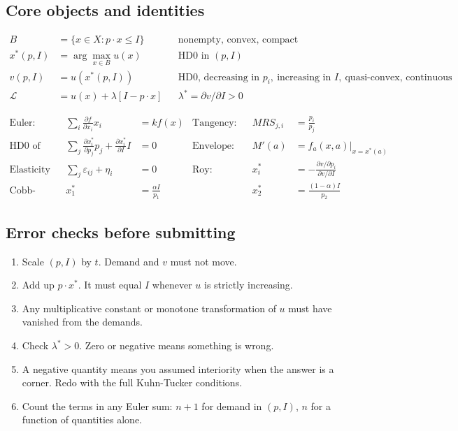 \documentclass[11pt]{article}
\theoremstyle{definition}
\newcommand{\xs}{x^*}
\newcommand{\pdd}[2]{\frac{\partial #1}{\partial #2}}
\begin{document}
\subsection{Core objects and identities}

\begin{align*}
B&=\{x\in X: p\cdot x\le I\} && \text{nonempty, convex, compact}\\
\xs(p,I)&=\arg\max_{x\in B}u(x) && \text{HD0 in }(p,I)\\
v(p,I)&=u(\xs(p,I)) && \text{HD0, decreasing in }p_i,\ \text{increasing in }I,\ \text{quasi-convex, continuous}\\
\mathcal{L}&=u(x)+\lambda[I-p\cdot x] && \lambda^*=\partial v/\partial I>0
\end{align*}

\begin{align*}
\text{Euler:}&& \sum_i \pdd{f}{x_i}x_i&=k f(x)
&\text{Tangency:}&& MRS_{j,i}&=\frac{p_i}{p_j}\\
\text{HD0 of demand:}&& \sum_j\pdd{x_i^*}{p_j}p_j+\pdd{x_i^*}{I}I&=0
&\text{Envelope:}&& M'(a)&=f_a(x,a)\big|_{x=x^*(a)}\\
\text{Elasticity form:}&& \sum_j\varepsilon_{ij}+\eta_i&=0
&\text{Roy:}&& x_i^*&=-\frac{\partial v/\partial p_i}{\partial v/\partial I}\\
\text{Cobb-Douglas:}&& x_1^*&=\frac{\alpha I}{p_1} &&& x_2^*&=\frac{(1-\alpha)I}{p_2}
\end{align*}

\subsection{Error checks before submitting}

\begin{enumerate}
\item Scale $(p,I)$ by $t$. Demand and $v$ must not move.
\item Add up $p\cdot\xs$. It must equal $I$ whenever $u$ is strictly increasing.
\item Any multiplicative constant or monotone transformation of $u$ must have vanished from
the demands.
\item Check $\lambda^*>0$. Zero or negative means something is wrong.
\item A negative quantity means you assumed interiority when the answer is a corner. Redo
with the full Kuhn-Tucker conditions.
\item Count the terms in any Euler sum: $n+1$ for demand in $(p,I)$, $n$ for a function of
quantities alone.
\end{enumerate}
\end{document}
